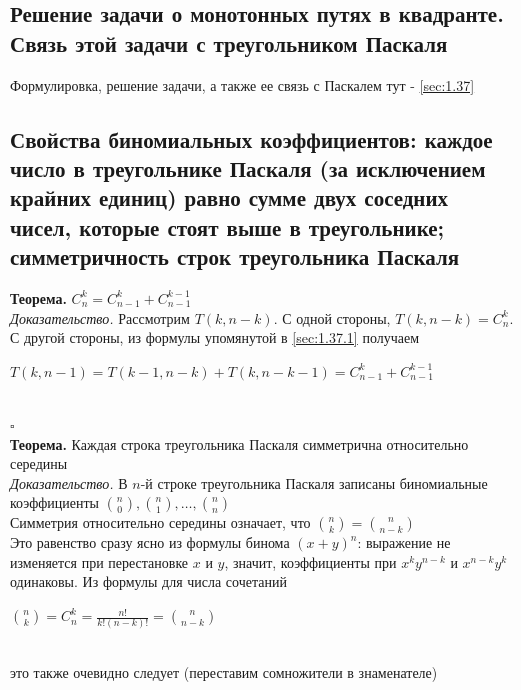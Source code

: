 \documentclass[a4paper]{article}
\newcommand{\qed}{\hfill$\square$}
\begin{document}
\subsection{Решение задачи о монотонных путях в квадранте. Связь этой задачи с треугольником Паскаля}
\label{sec:2.16}Формулировка, решение задачи, а также ее связь с Паскалем тут - \ref{sec:1.37}
\subsection{Свойства биномиальных коэффициентов: каждое число в треугольнике Паскаля (за исключением крайних единиц) равно сумме двух соседних чисел, которые стоят выше в треугольнике; симметричность строк треугольника Паскаля}
\textbf{Теорема.} $C_n^k=C_{n-1}^k+C_{n-1}^{k-1}$\\[2mm]
\textit{Доказательство.} Рассмотрим $T(k,n-k)$. С одной стороны, $T(k,n-k)=C_n^k$. С другой стороны, из формулы упомянутой в \ref{sec:1.37.1} получаем\\[2mm]
\centerline{$T(k,n-1)=T(k-1,n-k)+T(k,n-k-1)=C_{n-1}^k+C_{n-1}^{k-1}$}\\[2mm]
\qed\\[2mm]
\textbf{Теорема.} Каждая строка треугольника Паскаля симметрична относительно середины\\[2mm]
\textit{Доказательство.} В $n$-й строке треугольника Паскаля записаны биномиальные коэффициенты $\binom{n}{0},\binom{n}{1},\ldots,\binom{n}{n}$\\[2mm]
\indent Симметрия относительно середины означает, что $\binom{n}{k}=\binom{n}{n-k}$\\[2mm]
\indent Это равенство сразу ясно из формулы бинома $(x+y)^n$: выражение не изменяется при перестановке $x$ и $y$, значит, коэффициенты при $x^ky^{n-k}$ и $x^{n-k}y^k$ одинаковы. Из формулы для числа сочетаний\\[2mm]
\centerline{$\binom{n}{k}=C_n^k=\frac{n!}{k!(n-k)!}=\binom{n}{n-k}$}\\[2mm]
это также очевидно следует (переставим сомножители в знаменателе)
\end{document}
